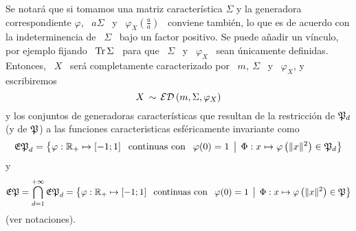 %
Se notar\'a que si tomamos  una matriz caracter\'istica $\Sigma$ y la generadora
correspondiente  $\varphi$, \  $a  \Sigma$ \  y  \ $\varphi_X\left(  \frac{u}{a}
\right)$ \ conviene tambi\'en, lo que  es de acuerdo con la indeterminencia de \
$\Sigma$ \ bajo un factor positivo.  Se puede a\~nadir un v\'inculo, por ejemplo
fijando  \  $\operatorname{Tr} \Sigma$  \  para  que  \ $\Sigma$  \  y  \ $\varphi_X$  \  sean
\'unicamente definidas. Entonces, \ $X$ \ ser\'a completamente caracterizado por
\ $m, \: \Sigma$ \ y \ $\varphi_X$, y escribiremos
%
\[
X \, \sim \, \mathcal{ED} \left( m , \Sigma , \varphi_X \right)
\]
%
y   los  conjuntos  de   generadoras  caracter\'isticas   que  resultan   de  la
restricci\'on  de   $\mathfrak{P}_d$  (y  de  $\mathfrak{P}$)  a   las  funciones  caracteristicas
esf\'ericamente invariante como
%
\[
\mathfrak{EP}_d = \big\{ 
\varphi: \mathbb{R}_+ \mapsto [-1 ; 1]  \:\: \mbox{  continuas con } \:\: \varphi(0) = 1  \:\: \big| \:\: \Phi: 
x \mapsto \varphi\left( \| x \|^2 \right)
\in \mathfrak{P}_d \big\}
\]
%
y
%
\[
\mathfrak{EP} = \bigcap_{d=1}^{+\infty} \mathfrak{EP}_d = \big\{ 
\varphi: \mathbb{R}_+ \mapsto [-1 ; 1]  \:\: \mbox{  continuas con } \:\: \varphi(0) = 1  \:\: \big| \:\: \Phi: 
x \mapsto \varphi\left( \| x \|^2 \right)
\in \mathfrak{P} \big\}
\]
%
(ver notaciones).

